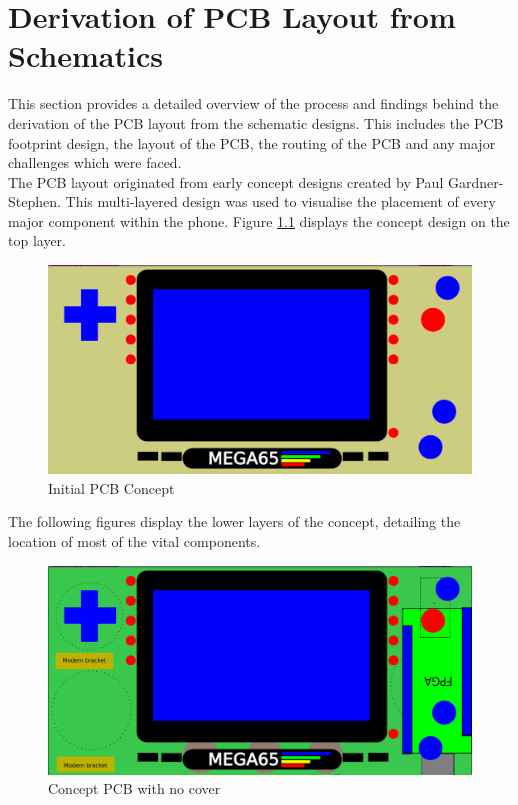 
\chapter{Derivation of PCB Layout from Schematics} %

\label{Chapter6} %

	This section provides a detailed overview of the process and findings behind the derivation of the PCB layout from the schematic designs. This includes the PCB footprint design, the layout of the PCB, the routing of the PCB and any major challenges which were faced.\\
The PCB layout originated from early concept designs created by Paul Gardner-Stephen. This multi-layered design was used to visualise the placement of every major component within the phone. Figure \ref{fig:Concept} displays the concept design on the top layer. 

\begin{figure}
	\includegraphics[width=\linewidth]{Figures/handset-layout-v1.pdf}
	\caption{Initial PCB Concept}
	\label{fig:Concept}
\end{figure}

	The following figures display the lower layers of the concept, detailing the location of most of the vital components. 

\begin{figure}
	\includegraphics[width=\linewidth]{Figures/handset-layout-v1-no-cover.pdf}
	\caption{Concept PCB with no cover}
	\label{fig:nocover}
\end{figure}

